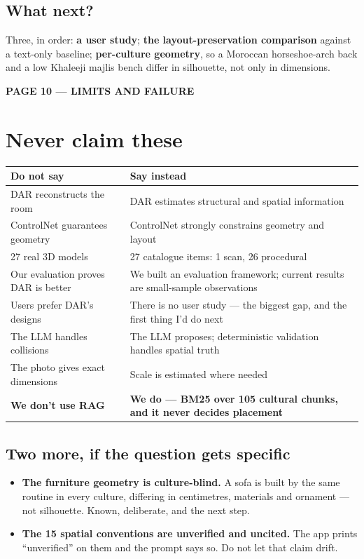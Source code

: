 \documentclass[10.5pt,a4paper]{article}
\newcommand{\pagelabel}[2]{%
  {\sffamily\bfseries\scriptsize\color{brass}\MakeUppercase{Page #1 --- #2}}\par\vspace{0.2em}}
\begin{document}
\subsection*{What next?}
Three, in order: \textbf{a user study}; \textbf{the layout-preservation comparison} against a
text-only baseline; \textbf{per-culture geometry}, so a Moroccan horseshoe-arch back and a low
Khaleeji majlis bench differ in silhouette, not only in dimensions.

\newpage
\pagelabel{10}{limits and failure}
\section*{Never claim these}

\begin{tabularx}{\linewidth}{@{}XX@{}}
\toprule
\textbf{Do not say} & \textbf{Say instead}\\
\midrule
DAR reconstructs the room & DAR estimates structural and spatial information\\
ControlNet guarantees geometry & ControlNet strongly constrains geometry and layout\\
27 real 3D models & 27 catalogue items: 1 scan, 26 procedural\\
Our evaluation proves DAR is better & We built an evaluation framework; current results are
  small-sample observations\\
Users prefer DAR's designs & There is no user study --- the biggest gap, and the first thing I'd do
  next\\
The LLM handles collisions & The LLM proposes; deterministic validation handles spatial truth\\
The photo gives exact dimensions & Scale is estimated where needed\\
\textbf{We don't use RAG} & \textbf{We do --- BM25 over 105 cultural chunks, and it never decides
  placement}\\
\bottomrule
\end{tabularx}

\subsection*{Two more, if the question gets specific}
\begin{itemize}[leftmargin=1.1em,itemsep=1pt]
  \item \textbf{The furniture geometry is culture-blind.} A sofa is built by the same routine in
        every culture, differing in centimetres, materials and ornament --- not silhouette. Known,
        deliberate, and the next step.
  \item \textbf{The 15 spatial conventions are unverified and uncited.} The app prints
        ``unverified'' on them and the prompt says so. Do not let that claim drift.
\end{itemize}
\end{document}
